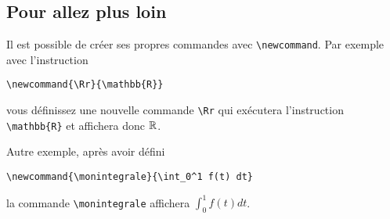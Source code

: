 \documentclass[10pt,class=article,crop=false]{standalone}
\begin{document}
\begin{multicols}{2}
\subsection{Pour allez plus loin}

Il est possible de créer ses propres commandes avec \verb?\newcommand?.
Par exemple avec l'instruction

\hfil \verb?\newcommand{\Rr}{\mathbb{R}}?

vous définissez une nouvelle commande \verb?\Rr? qui exécutera l'instruction
\verb?\mathbb{R}? et affichera donc $\Rr$.

Autre exemple, après avoir défini

\hfil \verb?\newcommand{\monintegrale}{\int_0^1 f(t) dt}?

la commande \verb?\monintegrale? affichera $\int_0^1 f(t) dt$.

\end{multicols}
\end{document}
